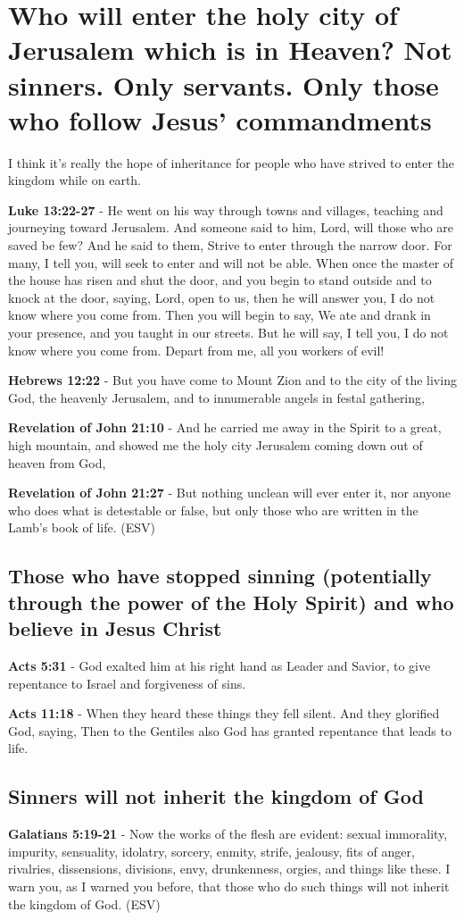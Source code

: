 \documentclass[11pt]{article}
\begin{document}
\section{Who will enter the holy city of Jerusalem which is in Heaven? Not sinners. Only servants. Only those who follow Jesus' commandments}
\label{sec:org4d5b930}
I think it's really the hope of inheritance for people who have strived to enter the kingdom while on earth.

\textbf{Luke 13:22-27} - He went on his way through towns and villages, teaching and journeying toward Jerusalem. And someone said to him, Lord, will those who are saved be few? And he said to them, Strive to enter through the narrow door. For many, I tell you, will seek to enter and will not be able. When once the master of the house has risen and shut the door, and you begin to stand outside and to knock at the door, saying, Lord, open to us, then he will answer you, I do not know where you come from. Then you will begin to say, We ate and drank in your presence, and you taught in our streets. But he will say, I tell you, I do not know where you come from. Depart from me, all you workers of evil!

\textbf{Hebrews 12:22} - But you have come to Mount Zion and to the city of the living God, the heavenly Jerusalem, and to innumerable angels in festal gathering,

\textbf{Revelation of John 21:10} - And he carried me away in the Spirit to a great, high mountain, and showed me the holy city Jerusalem coming down out of heaven from God,

\textbf{Revelation of John 21:27} -  But nothing unclean will ever enter it, nor anyone who does what is detestable or false, but only those who are written in the Lamb's book of life. (ESV)

\subsection{Those who have stopped sinning (potentially through the power of the Holy Spirit) and who believe in Jesus Christ}
\label{sec:orgd57ea19}
\textbf{Acts 5:31} - God exalted him at his right hand as Leader and Savior, to give repentance to Israel and forgiveness of sins.

\textbf{Acts 11:18} - When they heard these things they fell silent. And they glorified God, saying, Then to the Gentiles also God has granted repentance that leads to life.

\subsection{Sinners will not inherit the kingdom of God}
\label{sec:org301a2f8}
\textbf{Galatians 5:19-21} -  Now the works of the flesh are evident: sexual immorality, impurity, sensuality, idolatry, sorcery, enmity, strife, jealousy, fits of anger, rivalries, dissensions, divisions, envy, drunkenness, orgies, and things like these.  I warn you, as I warned you before, that those who do such things will not inherit the kingdom of God. (ESV)
\end{document}
